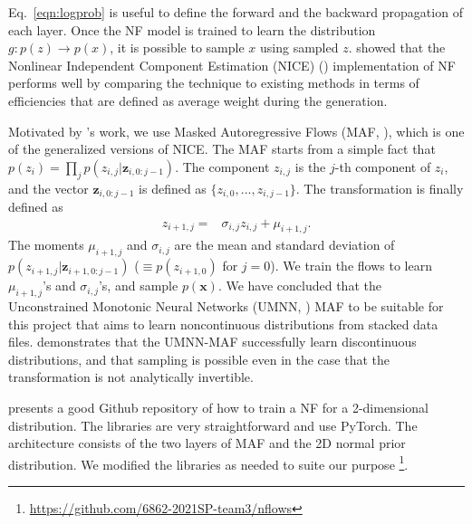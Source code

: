 Eq.~\ref{eqn:logprob} is useful to define the forward and the backward propagation of each layer.
Once the NF model is trained to learn the distribution $g: p(z)\rightarrow p(x)$, it is possible to sample $x$ using sampled $z$. \citet{PhysRevD.101.076002} showed that the Nonlinear Independent Component Estimation (NICE) (\citet{Dinh15}) implementation of NF performs well by comparing the technique to existing methods in terms of efficiencies that are defined as average weight during the generation.

Motivated by \citet{stan}'s work, we use Masked Autoregressive Flows (MAF, \citet{papamakarios2018masked}), which is one of the generalized versions of NICE. The MAF starts from a simple fact that $p(z_{i}) = \prod\limits_{j}p(z_{i,j}|\mathbf{z}_{i,0:j-1})$. The component $z_{i,j}$ is the $j$-th component of $z_i$, and the vector $\mathbf{z}_{i,0:j-1}$ is defined as $\{z_{i, 0}, ..., z_{i, j-1}\}$. The transformation is finally defined as
\begin{align}
    z_{i+1, j}=& \sigma_{i, j} z_{i, j} + \mu_{i+1, j}.
\end{align}
The moments $\mu_{i+1, j}$ and $\sigma_{i, j}$ are the mean and standard deviation of $p(z_{i+1,j}|\mathbf{z}_{i+1,0:j-1})$ ($\equiv p(z_{i+1,0})$ for $j=0$). We train the flows to learn $\mu_{i+1, j}$'s and $\sigma_{i, j}$'s, and sample $p(\mathbf{x})$. We have concluded that the Unconstrained Monotonic Neural Networks (UMNN, \citet{NEURIPS2019_2a084e55}) MAF to be suitable for this project that aims to learn noncontinuous distributions from stacked data files. \citet{NEURIPS2019_2a084e55} demonstrates that the UMNN-MAF successfully learn discontinuous distributions, and that sampling is possible even in the case that the transformation is not analytically invertible.

\citet{nflows} presents a good Github repository of how to train a NF for a 2-dimensional distribution. The libraries are very straightforward and use PyTorch. The architecture consists of the two layers of MAF and the 2D normal prior distribution. We modified the libraries as needed to suite our purpose \footnote{\url{https://github.com/6862-2021SP-team3/nflows}}.

